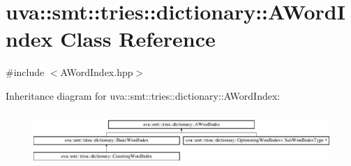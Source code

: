 \hypertarget{classuva_1_1smt_1_1tries_1_1dictionary_1_1_a_word_index}{}\section{uva\+:\+:smt\+:\+:tries\+:\+:dictionary\+:\+:A\+Word\+Index Class Reference}
\label{classuva_1_1smt_1_1tries_1_1dictionary_1_1_a_word_index}


{\ttfamily \#include $<$A\+Word\+Index.\+hpp$>$}

Inheritance diagram for uva\+:\+:smt\+:\+:tries\+:\+:dictionary\+:\+:A\+Word\+Index\+:\begin{figure}[H]
\begin{center}
\leavevmode
\includegraphics[height=2.024096cm]{classuva_1_1smt_1_1tries_1_1dictionary_1_1_a_word_index}
\end{center}
\end{figure}
